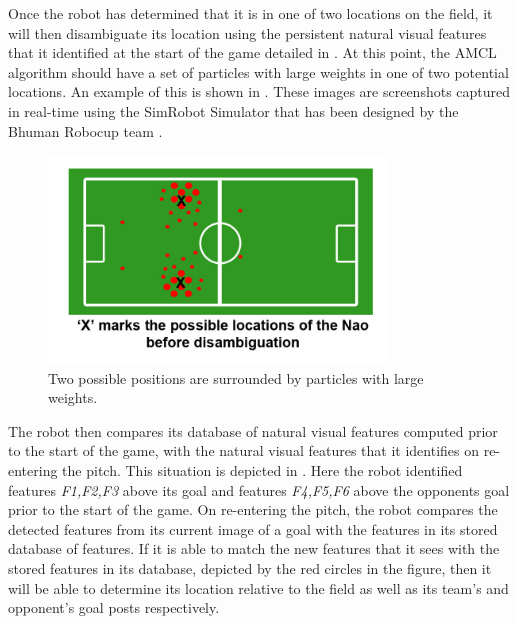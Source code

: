 \documentclass{report}
\begin{document}
Once the robot has determined that it is in one of two locations on the field, it will then disambiguate its location using the persistent natural visual features that it identified at the start of the game detailed in . At this point, the AMCL algorithm should have a set of particles with large weights in one of two potential locations. An example of this is shown in . These images are screenshots captured in real-time using the SimRobot Simulator that has been designed by the Bhuman Robocup team \cite{Bhuman}.\\

\begin{figure}[h!] 
  \centering
    \includegraphics[width=0.8\textwidth]{../Drawings/localisation/beforeDisambiguate.jpg}
    \caption{Two possible positions are surrounded by particles with large weights.}
    \label{fig:before}
\end{figure}

The robot then compares its database of natural visual features computed prior to the start of the game, with the natural visual features that it identifies on re-entering the pitch. This situation is depicted in . Here the robot identified features \textit{F1,F2,F3} above its goal and features \textit{F4,F5,F6} above the opponents goal prior to the start of the game. On re-entering the pitch, the robot compares the detected features from its current image of a goal with the features in its stored database of features. If it is able to match the new features that it sees with the stored features in its database, depicted by the red circles in the figure, then it will be able to determine its location relative to the field as well as its team's and opponent's goal posts respectively.\\
\end{document}
